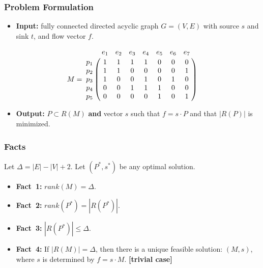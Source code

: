 \frame
{
	\frametitle{Problem Formulation}

	\begin{itemize}
	\item<1-> {\bf Input:} fully connected directed acyclic graph $G=(V,E)$ with source $s$ and sink $t$,
		and flow vector $f$.
	\end{itemize}

	\vspace{0.8cm}
	
	\vspace{-0.1cm}

	\begin{displaymath}
	M = \bordermatrix{
		~   & e_1 & e_2 & e_3 & e_4 & e_5 & e_6 & e_7 \cr
		p_1 & 1 & 1 & 1 & 1 & 0 & 0 & 0 \cr
		p_2 & 1 & 1 & 0 & 0 & 0 & 0 & 1 \cr
		p_3 & 1 & 0 & 0 & 1 & 0 & 1 & 0 \cr
		p_4 & 0 & 0 & 1 & 1 & 1 & 0 & 0 \cr
		p_5 & 0 & 0 & 0 & 0 & 1 & 0 & 1 \cr
	}
	\end{displaymath}

	\vspace{0.1cm}

	\begin{itemize}
	\item<1-> {\bf Output:} $P\subset R(M)$ {\bf and} vector $s$
		such that $f = s\cdot P$ and that $|R(P)|$ is minimized.
	\end{itemize}
}

\frame
{
	\frametitle{Facts}
	Let $\Delta = |E| - |V| + 2$. Let $(P^*, s^*)$ be any optimal solution.
	\vspace{0.3cm}
	\begin{itemize}
	\item<1-> {\bf Fact~1:} $rank(M) = \Delta$.
	\vspace{0.3cm}
	\item<1-> {\bf Fact~2:} $rank(P^*) = |R(P^*)|$.
	\vspace{0.3cm}
	\item<1-> {\bf Fact~3:} $|R(P^*)| \le \Delta$.
	\vspace{0.3cm}
	\item<1-> {\bf Fact~4:} If $|R(M)| = \Delta$, then there is a unique feasible solution: $(M, s)$, where
		$s$ is determined by $f = s\cdot M$. {\bf [trivial case]}
	\end{itemize}
	\vspace{1.0cm}
	
	\vspace{-0.1cm}
}


